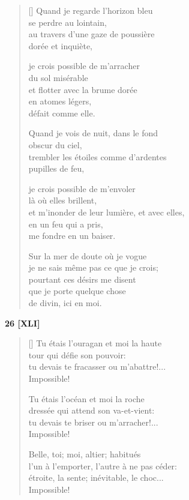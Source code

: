 \documentclass[a4paper,12pt]{book}
\begin{document}
\begin{verse}[\versewidth]
  Quand je regarde l'horizon bleu \\
  se perdre au lointain, \\
  au travers d'une gaze de poussière \\
  dorée et inquiète,

  je crois possible de m'arracher \\
  du sol misérable \\
  et flotter avec la brume dorée \\
  en atomes légers, \\
  défait comme elle.

  Quand je vois de nuit, dans le fond \\
  obscur du ciel, \\
  trembler les étoiles comme d'ardentes \\
  pupilles de feu,

  je crois possible de m'envoler \\
  là où elles brillent, \\
  et m'inonder de leur lumière, et avec elles, \\
  en un feu qui a pris, \\
  me fondre en un baiser.

  Sur la mer de doute où je vogue \\
  je ne sais même pas ce que je crois; \\
  pourtant ces désirs me disent \\
  que je porte quelque chose \\
  de divin, ici en moi.
\end{verse}

\bigskip

\begin{center}
  \textbf{26 [XLI]}
\end{center}

\settowidth{\versewidth}{l'un à l'emporter, l'autre à ne pas céder;}

\begin{verse}[\versewidth]
  Tu étais l'ouragan et moi la haute \\
  tour qui défie son pouvoir: \\
  tu devais te fracasser ou m'abattre!... \\
  Impossible!

  Tu étais l'océan et moi la roche \\
  dressée qui attend son va-et-vient: \\
  tu devais te briser ou m'arracher!... \\
  Impossible!

  Belle, toi; moi, altier; habitués \\
  l'un à l'emporter, l'autre à ne pas céder: \\
  étroite, la sente; inévitable, le choc... \\
  Impossible!
\end{verse}
\end{document}
